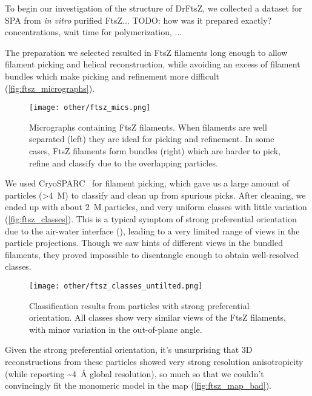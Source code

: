 To begin our investigation of the structure of DrFtsZ, we collected a dataset for SPA from \textit{in vitro} purified FtsZ... TODO: how was it prepared exactly? concentrations, wait time for polymerization, ...

The preparation we selected resulted in FtsZ filaments long enough to allow filament picking and helical reconstruction, while avoiding an excess of filament bundles which make picking and refinement more difficult (\autoref{fig:ftsz_micrographs}).

\begin{figure}[ht]
    \centering
    \texttt{[image: other/ftsz\_mics.png]}
    \caption[Micrographs of FtsZ filaments]{Micrographs containing FtsZ filaments. When filaments are well separated (left) they are ideal for picking and refinement. In some cases, FtsZ filaments form bundles (right) which are harder to pick, refine and classify due to the overlapping particles.}
    \label{fig:ftsz_micrographs}
\end{figure}

We used CryoSPARC~\cite{punjaniCryoSPARCAlgorithmsRapid2017} for filament picking, which gave us a large amount of particles (>\qty{4}{M}) to classify and clean up from spurious picks.
After cleaning, we ended up with about \qty{2}{M} particles, and very uniform classes with little variation (\autoref{fig:ftsz_classes}).
This is a typical symptom of strong preferential orientation due to the air-water interface (), leading to a very limited range of views in the particle projections.
Though we saw hints of different views in the bundled filaments, they proved impossible to disentangle enough to obtain well-resolved classes.

\begin{figure}[ht]
    \centering
    \texttt{[image: other/ftsz\_classes\_untilted.png]}
    \caption[FtsZ filament: 2D classes]{Classification results from particles with strong preferential orientation. All classes show very similar views of the FtsZ filaments, with minor variation in the out-of-plane angle.}
    \label{fig:ftsz_classes}
\end{figure}

Given the strong preferential orientation, it's unsurprising that 3D reconstructions from these particles showed very strong resolution anisotropicity (while reporting \sim\qty{4}{\angstrom} global resolution), so much so that we couldn't convincingly fit the monomeric model in the map (\autoref{fig:ftsz_map_bad}).

